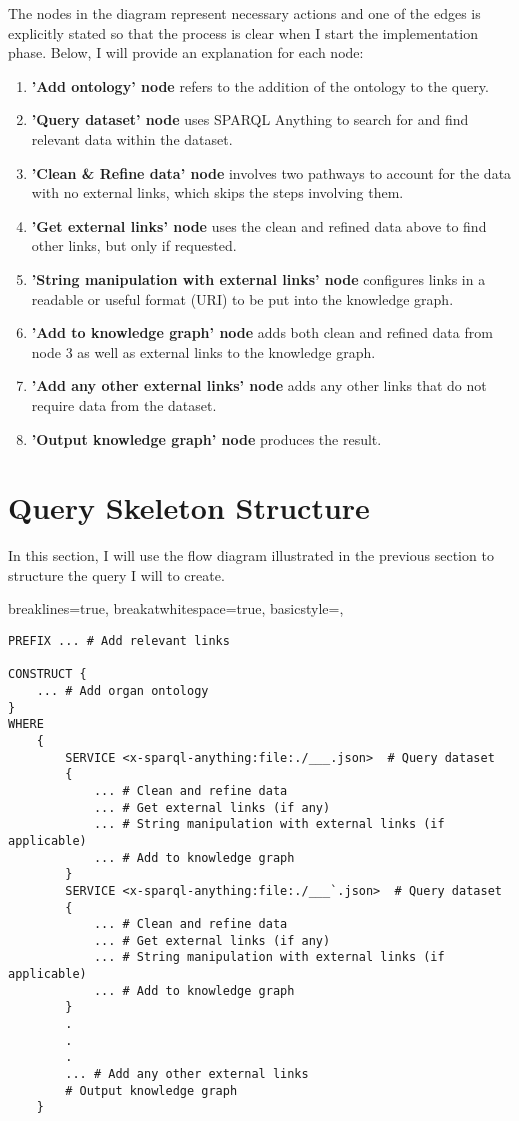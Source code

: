 The nodes in the diagram represent necessary actions and one of the edges is explicitly stated so that the process is clear when I start the implementation phase. Below, I will provide an explanation for each node: 

\begin{enumerate}
  \item \textbf{'Add ontology' node} refers to the addition of the ontology to the query.
  \item \textbf{'Query dataset' node} uses SPARQL Anything to search for and find relevant data within the dataset.
  \item \textbf{'Clean \& Refine data' node} involves two pathways to account for the data with no external links, which skips the steps involving them. %
  \item \textbf{'Get external links' node} uses the clean and refined data above to find other links, but only if requested.
  \item \textbf{'String manipulation with external links' node} configures links in a readable or useful format (URI) to be put into the knowledge graph.
  \item \textbf{'Add to knowledge graph' node} adds both clean and refined data from node 3 as well as external links to the knowledge graph.  %
  \item \textbf{'Add any other external links' node} adds any other links that do not require data from the dataset.
  \item \textbf{'Output knowledge graph' node} produces the result.
\end{enumerate}

\section{Query Skeleton Structure}
\hspace{0.5cm} In this section, I will use the flow diagram illustrated in the previous section to structure the query I will to create.

\lstset
{
    breaklines=true,
    breakatwhitespace=true,
    basicstyle=\ttfamily,
}
\begin{lstlisting}
PREFIX ... # Add relevant links

CONSTRUCT {
    ... # Add organ ontology
} 
WHERE 
    { 
        SERVICE <x-sparql-anything:file:./___.json>  # Query dataset
        { 
            ... # Clean and refine data
            ... # Get external links (if any)
            ... # String manipulation with external links (if applicable)
            ... # Add to knowledge graph
        } 
        SERVICE <x-sparql-anything:file:./___`.json>  # Query dataset
        { 
            ... # Clean and refine data
            ... # Get external links (if any)
            ... # String manipulation with external links (if applicable)
            ... # Add to knowledge graph
        } 
        .
        .
        .
        ... # Add any other external links 
        # Output knowledge graph
    }

\end{lstlisting}


